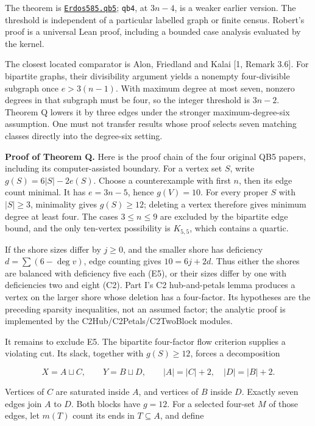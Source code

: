 \documentclass[smallextended]{svjour3}
\newcounter{none} %
\begin{document}
The theorem is
\href{https://github.com/alejandrozu/openmath-2026-judging/blob/70c5ec3107658182f22c207d4c50f53f9cb3e602/robert-review-2026-10-07/lean/Openmath/Proofs/QB5/Statement.lean\#L42}{\texttt{Erdos585.qb5}};
\texttt{qb4}, at \(3n-4\), is a weaker earlier version. The threshold is
independent of a particular labelled graph or finite census. Robert's
proof is a universal Lean proof, including a bounded case analysis
evaluated by the kernel.

The closest located comparator is Alon, Friedland and Kalai {[}1, Remark
3.6{]}. For bipartite graphs, their divisibility argument yields a
nonempty four-divisible subgraph once \(e>3(n-1)\). With maximum degree
at most seven, nonzero degrees in that subgraph must be four, so the
integer threshold is \(3n-2\). Theorem Q lowers it by three edges under
the stronger maximum-degree-six assumption. One must not transfer
results whose proof selects seven matching classes directly into the
degree-six setting.

\textbf{Proof of Theorem Q.} Here is the proof chain of the four
original QB5 papers, including its computer-assisted boundary. For a
vertex set \(S\), write \(g(S)=6|S|-2e(S)\). Choose a counterexample
with first \(n\), then its edge count minimal. It has \(e=3n-5\), hence
\(g(V)=10\). For every proper \(S\) with \(|S|\ge3\), minimality gives
\(g(S)\ge12\); deleting a vertex therefore gives minimum degree at least
four. The cases \(3\le n\le9\) are excluded by the bipartite edge bound,
and the only ten-vertex possibility is \(K_{5,5}\), which contains a
quartic.

If the shore sizes differ by \(j\ge0\), and the smaller shore has
deficiency \(d=\sum(6-\deg v)\), edge counting gives \(10=6j+2d\). Thus
either the shores are balanced with deficiency five each (E5), or their
sizes differ by one with deficiencies two and eight (C2). Part I's C2
hub-and-petals lemma produces a vertex on the larger shore whose
deletion has a four-factor. Its hypotheses are the preceding sparsity
inequalities, not an assumed factor; the analytic proof is implemented
by the C2Hub/C2Petals/C2TwoBlock modules.

It remains to exclude E5. The bipartite four-factor flow criterion
supplies a violating cut. Its slack, together with \(g(S)\ge12\), forces
a decomposition

\[
X=A\sqcup C,\qquad Y=B\sqcup D,\qquad
|A|=|C|+2,\quad |D|=|B|+2.
\]

Vertices of \(C\) are saturated inside \(A\), and vertices of \(B\)
inside \(D\). Exactly seven edges join \(A\) to \(D\). Both blocks have
\(g=12\). For a selected four-set \(M\) of those edges, let \(m(T)\)
count its ends in \(T\subseteq A\), and define
\end{document}
